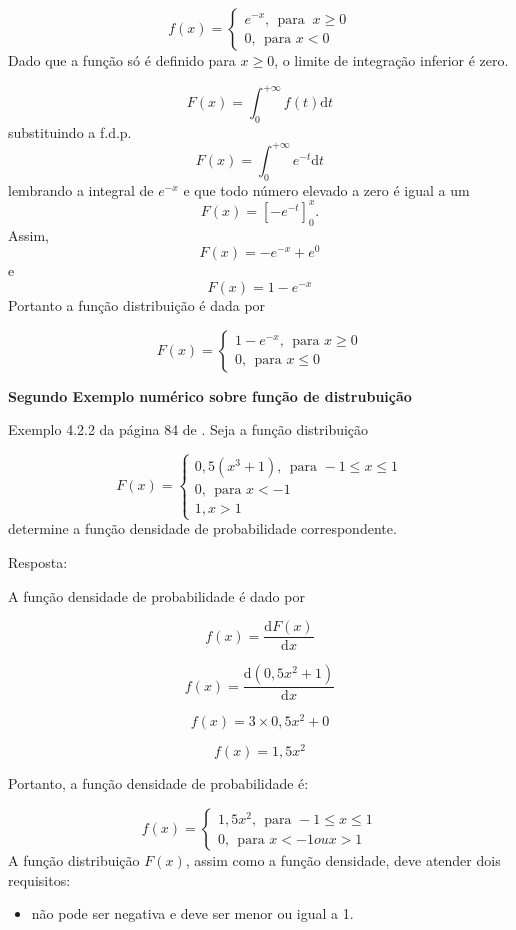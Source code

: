 \documentclass[
]{book}
\providecommand{\tightlist}{%
  \setlength{\itemsep}{0pt}\setlength{\parskip}{0pt}}
\begin{document}
\[
  f(x) = 
  \begin{cases}
    e^{-x},~~\text{para }~ x \geq 0\\
    0,~~\text{para } x< 0
  \end{cases}
\]
Dado que a função só é definido para \(x\geq 0\), o limite de integração inferior é zero.

\[
  F(x) = \int_{0}^{+\infty} f(t)\text{d}t
\]
substituindo a f.d.p.
\[
  F(x) = \int_{0}^{+\infty} e^{-t}\text{d}t
\]
lembrando a integral de \(e^{-x}\) e que todo número elevado a zero é igual a um
\[
  F(x) = \left[ -e^{-t}  \right]_{0}^{x}.
\]
Assim,
\[
  F(x) = -e^{-x} + e^{0}
\]
e
\[
  F(x) = 1 - e^{-x}
\]
Portanto a função distribuição é dada por

\[
  F(x) =
  \begin{cases}
    1 - e^{-x},~~\text{para } x\geq 0 \\
    0,~~\text{para } x\leq 0
  \end{cases}
\]

\textbf{Segundo Exemplo numérico sobre função de distrubuição}

Exemplo 4.2.2 da página 84 de \citet{Sartoris2013}. Seja a função distribuição

\[
  F(x) = 
  \begin{cases}
    0,5(x^3 + 1),~~\text{para } -1\leq x \leq 1\\
    0,~~\text{para }x < -1\\
    1, x > 1
  \end{cases}
\]
determine a função densidade de probabilidade correspondente.

Resposta:

A função densidade de probabilidade é dado por

\[
  f(x) = \dfrac{\text{d}F(x)}{\text{d}x}
\]

\[
  f(x) = \dfrac{\text{d}(0,5 x^2  + 1)}{\text{d}x}
\]

\[
  f(x) = 3 \times 0,5x^2 + 0
\]

\[
  f(x) = 1,5 x^2 
\]

Portanto, a função densidade de probabilidade é:

\[
  f(x) = 
  \begin{cases}
    1,5x^2,~~\text{para } -1\leq x \leq 1\\
    0,~~\text{para }x < -1 ou x > 1
  \end{cases}
\]
A função distribuição \(F(x)\), assim como a função densidade, deve atender dois requisitos:

\begin{itemize}
\tightlist
\item
  não pode ser negativa e deve ser menor ou igual a 1.
\end{itemize}
\end{document}
